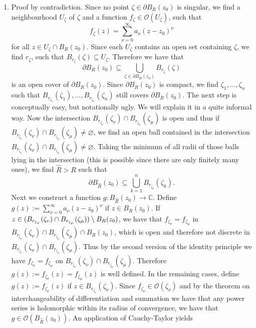 \begin{enumerate}[label = \textbf{Exercise \arabic*.},wide = 0pt, itemsep=1.5ex]
	\item Proof by contradiction. Since no point $\zeta \in \partial B_R(z_0)$ is singular, we find a neighbourhood $U_\zeta$ of $\zeta$ and a function $f_\zeta \in \mathcal{O}(U_\zeta)$, such that 
		\begin{equation}
			f_\zeta(z) = \sum_{\nu = 0}^\infty a_\nu(z - z_0)^\nu
		\end{equation}
		\noindent for all $z \in U_\zeta \cap B_R(z_0)$. Since each $U_\zeta$ contains an open set containing $\zeta$, we find $r_\zeta$, such that $B_{r_\zeta}(\zeta) \subseteq U_\zeta$. Therefore we have that
		\begin{equation}
			\partial B_R(z_0) \subseteq \bigcup_{\zeta \in \partial B_R(z_0)} B_{r_\zeta}(\zeta)
		\end{equation}
		\noindent is an open cover of $\partial B_R(z_0)$. Since $\partial B_R(z_0)$ is compact, we find $\zeta_1,\dots,\zeta_n$ such that $B_{r_{\zeta_1}}(\zeta_1),\dots,B_{r_{\zeta_n}}(\zeta_n)$ still covers $\partial B_R(z_0)$. The next step is conceptually easy, but notationally ugly. We will explain it in a quite informal way. Now the intersection $B_{r_{\zeta_\nu}}(\zeta_\nu) \cap B_{r_{\zeta_\mu}}(\zeta_\mu)$ is open and thus if $B_{r_{\zeta_\nu}}(\zeta_\nu) \cap B_{r_{\zeta_\mu}}(\zeta_\mu) \neq \varnothing$, we find an open ball contained in the intersection $B_{r_{\zeta_\nu}}(\zeta_\nu) \cap B_{r_{\zeta_\mu}}(\zeta_\mu) \neq \varnothing$. Taking the minimum of all radii of those balls lying in the intersection (this is possible since there are only finitely many ones), we find $\hat{R} > R$ such that
		\begin{equation}
			\partial B_{\hat{R}}(z_0) \subseteq \bigcup_{k = 1}^n B_{r_{\zeta_k}}(\zeta_k).
		\end{equation}
		Next we construct a function $g: B_{\hat{R}}(z_0) \to \mathbb{C}$. Define $g(z) := \sum_{\nu = 0}^\infty a_\nu (z - z_0)^\nu$ if $z \in B_R(z_0)$. If $z \in \del[0]{B_{r_{\zeta_\nu}}(\zeta_\nu) \cap B_{r_{\zeta_\mu}}(\zeta_\mu)} \setminus B_R(z_0)$, we have that $f_{\zeta_\nu} = f_{\zeta_\mu}$ in $B_{r_{\zeta_\nu}}(\zeta_\nu) \cap B_{r_{\zeta_\mu}}(\zeta_\mu) \cap B_R(z_0)$, which is open and therefore not discrete in $B_{r_{\zeta_\nu}}(\zeta_\nu) \cap B_{r_{\zeta_\mu}}(\zeta_\mu)$. Thus by the second version of the identity principle we have $f_{\zeta_\nu} = f_{\zeta_{\mu}}$ on $B_{r_{\zeta_\nu}}(\zeta_\nu) \cap B_{r_{\zeta_\mu}}(\zeta_\mu)$. Therefore $g(z) := f_{\zeta_{\nu}}(z) = f_{\zeta_\mu}(z)$ is well defined. In the remaining cases, define $g(z) := f_{\zeta_\nu}(z)$ if $z \in B_{r_{\zeta_\nu}}(\zeta_\nu)$. Since $f_{\zeta_\nu} \in \mathcal{O}(\zeta_\nu)$ and by the theorem on interchangeability of differentiation and summation we have that any power series is holomorphic within its radius of convergence, we have that $g \in \mathcal{O}(B_{\hat{R}}(z_0))$. An application of Cauchy-Taylor yields

\end{enumerate}
